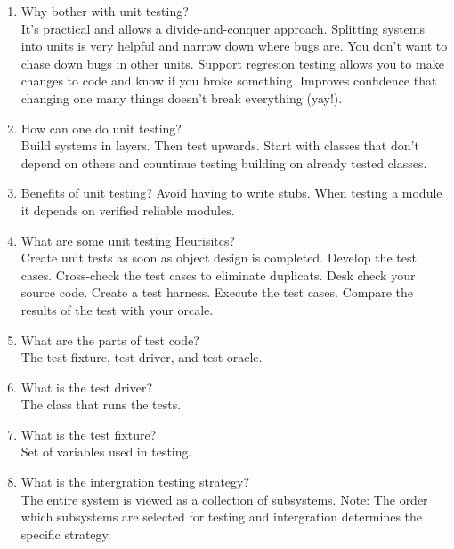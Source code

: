 \documentclass[10pt]{article}
\begin{document}
\begin{enumerate}
      \item Why bother with unit testing?\\
            It's practical and allows a divide-and-conquer approach. Splitting systems into units is very helpful and narrow down where bugs are. You don't want to chase down bugs in other units. Support regresion testing
            allows you to make changes to code and know if you broke something. Improves confidence that changing one many things doesn't break everything (yay!).\\

      \item How can one do unit testing?\\
            Build systems in layers. Then test upwards. Start with classes that don't depend on others and countinue testing building on already tested classes.

      \item Benefits of unit testing?
            Avoid having to write stubs. When testing a module it depends on verified reliable modules.\\

      \item What are some unit testing Heurisitcs?\\
            Create unit tests as soon as object design is completed. Develop the test cases. Cross-check the test cases to eliminate duplicats. Desk check your source code. Create a test harness. Execute the test cases. Compare the results
            of the test with your orcale.\\

      \item What are the parts of test code?
            \\ The test fixture, test driver, and test oracle.\\
      \item What is the test driver?\\
            The class that runs the tests.\\

      \item What is the test fixture?\\
            Set of variables used in testing.\\

      \item What is the intergration testing strategy?\\
            The entire system is viewed as a collection of subsystems. Note: The order which subsystems are selected for testing and intergration determines the specific strategy.\\



\end{enumerate}
\end{document}
